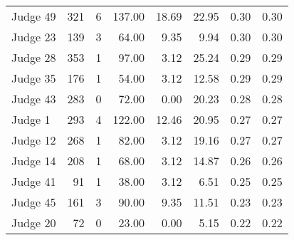\begin{tabular}{lrrrrrrr}
Judge 49 &   321 &      6 & 137.00 &      18.69 &     22.95 &         0.30 &      0.30 \\
Judge 23 &   139 &      3 &  64.00 &       9.35 &      9.94 &         0.30 &      0.30 \\
Judge 28 &   353 &      1 &  97.00 &       3.12 &     25.24 &         0.29 &      0.29 \\
Judge 35 &   176 &      1 &  54.00 &       3.12 &     12.58 &         0.29 &      0.29 \\
Judge 43 &   283 &      0 &  72.00 &       0.00 &     20.23 &         0.28 &      0.28 \\
 Judge 1 &   293 &      4 & 122.00 &      12.46 &     20.95 &         0.27 &      0.27 \\
Judge 12 &   268 &      1 &  82.00 &       3.12 &     19.16 &         0.27 &      0.27 \\
Judge 14 &   208 &      1 &  68.00 &       3.12 &     14.87 &         0.26 &      0.26 \\
Judge 41 &    91 &      1 &  38.00 &       3.12 &      6.51 &         0.25 &      0.25 \\
Judge 45 &   161 &      3 &  90.00 &       9.35 &     11.51 &         0.23 &      0.23 \\
Judge 20 &    72 &      0 &  23.00 &       0.00 &      5.15 &         0.22 &      0.22 \\
\bottomrule
\end{tabular}
